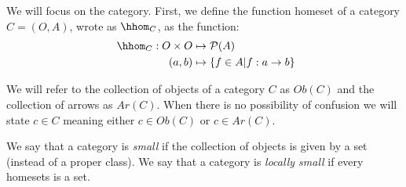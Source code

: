We will focus on the category. First, we define the function homeset of a category $C=(O,A)$, wrote as $\hhom_{C}$, as the function:
\begin{align*}
  && \hhom_{C}: O \times O &\mapsto \mathcal{P}(A)&\\
  \displaystyle &\ &(a,b)&\mapsto \{f\in A | f:a\to b\}&
\end{align*}

We will refer to the collection of objects of a category $C$ as $Ob(C)$ and the collection of arrows as $Ar(C)$. When there is no possibility of confusion we will state $c\in C$ meaning either $c\in Ob(C)$ or $c\in Ar(C)$.

\begin{definition}
  We say that a category is \emph{small} if the collection of objects is given by a set (instead of a proper class). We say that a category is \emph{locally small} if every homesets is a set.
\end{definition}

